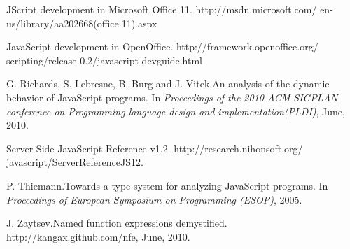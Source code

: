\documentclass[10pt, preprint]{sigplanconf}
\begin{document}
\begin{thebibliography}{}
JScript development in Microsoft Office 11.
\newblock http://msdn.microsoft.com/ en-us/library/aa202668(office.11).aspx

JavaScript development in OpenOffice.
\newblock http://framework.openoffice.org/ scripting/release-0.2/javascript-devguide.html

G. Richards, S. Lebresne, B. Burg and J. Vitek.\newblock An analysis of the dynamic behavior of JavaScript programs.
\newblock In \emph{Proceedings of the 2010 ACM SIGPLAN conference on Programming language design and implementation(PLDI)},
June, 2010.

Server-Side JavaScript Reference v1.2.
\newblock http://research.nihonsoft.org/ javascript/ServerReferenceJS12.

P. Thiemann.\newblock Towards a type system for analyzing JavaScript programs.
\newblock In \emph{Proceedings of European Symposium on Programming (ESOP)},
2005.

J. Zaytsev.\newblock Named function expressions demystified.
\newblock http://kangax.github.com/nfe,
June, 2010.


\end{thebibliography}
\end{document}
